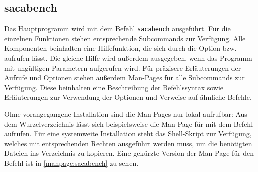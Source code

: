 \subsection{sacabench}
\label{framework:cli:sacabench}

Das Hauptprogramm wird mit dem Befehl \texttt{sacabench} ausgeführt.
Für die einzelnen Funktionen stehen ent\-sprech\-ende Subcommands zur Verfügung.
Alle Komponenten beinhalten eine Hilfefunktion, die sich durch die Option  bzw.  aufrufen lässt.
Die gleiche Hilfe wird außerdem ausgegeben, wenn das Programm mit ungültigen Parametern aufgerufen wird.
Für präzisere Erläuterungen der Aufrufe und Optionen stehen außerdem Man-Pages für alle Subcommands zur Verfügung.
Diese beinhalten eine Beschreibung der Befehlssyntax sowie Erläuterungen zur Verwendung der Optionen und Verweise auf ähnliche Befehle.\par
Ohne vorangegangene Installation sind die Man-Pages nur lokal aufrufbar: Aus dem \sacabench Wurzelverzeichnis lässt sich beispielsweise die Man-Page für   mit dem Befehl  aufrufen. Für eine systemweite Installation steht das Shell-Skript  zur Verfügung, welches mit entsprechenden Rechten ausgeführt werden muss, um die benötigten Dateien ins Verzeichnis  zu kopieren.
Eine gekürzte Version der Man-Page für den Befehl  ist in \cref{manpage:sacabench} zu sehen.
